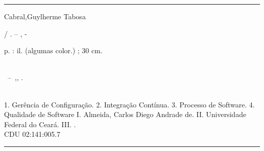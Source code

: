 
%
%     
\begin{fichacatalografica}
	\vspace*{\fill}					%
	\hrule							%
	\begin{center}					%
	\begin{minipage}[c]{12.5cm}		%
	
	Cabral,Guylherme Tabosa
	
	\hspace{0.5cm} \imprimirtitulo  / \imprimirautor. --
	\imprimirlocal, \imprimirdata-
	
	\hspace{0.5cm} \pageref{LastPage} p. : il. (algumas color.) ; 30 cm.\\
	
	\hspace{0.5cm} \imprimirorientadorRotulo~\imprimirorientador\\
	
	\hspace{0.5cm}
	\parbox[t]{\textwidth}{\imprimirtipotrabalho~--~\imprimirinstituicao,\imprimirlocal,
	\imprimirdata.}\\
	
	\hspace{0.5cm}
		1. Gerência de Configuração.
		2. Integração Contínua.
		3. Processo de Software.
		4. Qualidade de Software
		I. Almeida, Carlos Diego Andrade de.
		II. Universidade Federal do Ceará.
		III. \imprimirtitulo.\\ 			
	
	\hspace{8.75cm} CDU 02:141:005.7\\
	
	\end{minipage}
	\end{center}
	\hrule
\end{fichacatalografica}

